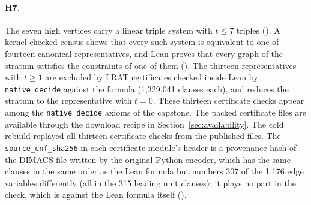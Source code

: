 \documentclass{anvil-paper}
\newcommand{\rp}{research/problems/erdos-85-wip-01}
\newcommand{\repocommitvtwo}{bfb1817446dd69da4d5fc1ea148a0ca9a8b0c9e2}
\newcommand{\repofilevtwo}[2]{\href{https://github.com/rjwalters/lean-genius/blob/\repocommitvtwo/#1}{\lean{#2}}}
\theoremstyle{definition}
\begin{document}
\paragraph{H7.} The seven high vertices carry a linear triple system with $t\le 7$ triples (). A kernel-checked census shows that every such system is equivalent to one of fourteen canonical representatives, and Lean proves that every graph of the stratum satisfies the constraints of one of them (). The thirteen representatives with $t\ge 1$ are excluded by LRAT certificates checked inside Lean by \texttt{native\_decide} against the formula  (1,329,041 clauses each), and  reduces the stratum to the representative with $t=0$. These thirteen certificate checks appear among the \texttt{native\_decide} axioms of the capstone. The packed certificate files are available through the download recipe in Section~\ref{sec:availability}. The cold rebuild replayed all thirteen certificate checks from the published files. The \texttt{source\_cnf\_sha256} in each certificate module's header is a provenance hash of the DIMACS file written by the original Python encoder, which has the same clauses in the same order as the Lean formula but numbers 307 of the 1,176 edge variables differently (all in the 315 leading unit clauses); it plays no part in the check, which is against the Lean formula itself (\repofilevtwo{\rp/H7_SOURCE_CNF_SHA256_NOTE.md}{H7_SOURCE_CNF_SHA256_NOTE.md}).
\end{document}
